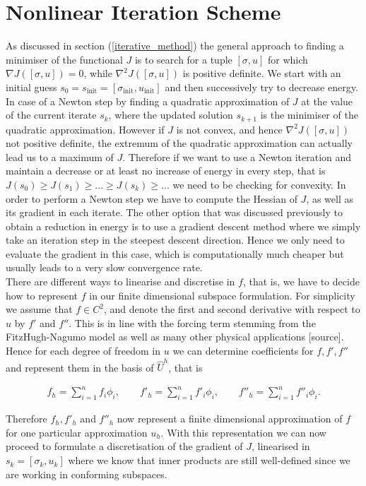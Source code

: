 \documentclass[../draft_1.tex]{subfiles}
\begin{document}
\section{Nonlinear Iteration Scheme}
As discussed in section (\ref{iterative_method}) the general approach to finding a minimiser of the functional $J$ is to search for a tuple $[\sigma, u]$ for which $\nabla  J ([\sigma, u])= 0$, while $\nabla^2 J ([\sigma, u]) $ is positive definite. We start with an initial guess $s_0 = s_{\text{init}} = [\sigma_{\text{init}}, u_{\text{init}}]$ and then successively try to decrease energy. In case of a Newton step by finding a quadratic approximation of $J$ at the value of the current iterate $s_k$, where the updated solution $s_{k+1}$ is the minimiser of the quadratic approximation. However if $J$ is not convex, and hence $\nabla^2 J ([\sigma, u]) $ not positive definite, the extremum of the quadratic approximation can actually lead us to a maximum of $J$. Therefore if we want to use a Newton iteration and maintain a decrease or at least no increase of energy in every step, that is $J(s_0) \geq J(s_1) \geq ... \geq J(s_k) \geq ... $ we need to be checking for convexity. In order to perform a Newton step we have to compute the Hessian of $J$, as well as its gradient in each iterate. The other option that was discussed previously to obtain a reduction in energy is to use a gradient descent method where we simply take an iteration step in the steepest descent direction. Hence we only need to evaluate the gradient in this case, which is computationally much cheaper but usually leads to a very slow convergence rate.
\smallskip
\\
There are different ways to linearise and discretise in $f$, that is, we have to decide how to represent $f$ in our finite dimensional subspace formulation. For simplicity we assume that $f \in C^2$, and denote the first and second derivative with respect to $u$ by $f'$ and $f''$. This is in line with the forcing term stemming from the FitzHugh-Nagumo model as well as many other physical applications [source]. Hence for each degree of freedom in $u$ we can determine coefficients for $f, f', f''$ and represent them in the basis of $\hat{U}^h$, that is 
\begin{ceqn}
	\begin{align}
	\label{discretisation_f}
f_h= \sum_{i=1}^{n} f_i \phi_i, \qquad f'_h = \sum_{i=1}^{n} f'_i \phi_i, \qquad  f''_h = \sum_{i=1}^{n} f''_i \phi_i.
	\end{align}
\end{ceqn}
Therefore $f_h, f'_h$ and $f''_h$ now represent a finite dimensional approximation of $f$ for one particular approximation $u_h$. With this representation we can now proceed to formulate a discretisation of the gradient of $J$, linearised in $s_k = [\sigma_k, u_k]$ where we know that inner products are still well-defined since we are working in conforming subspaces.
\end{document}
